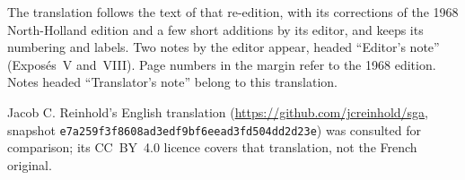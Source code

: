 \documentclass[11pt,a4paper,oneside]{book}
\begin{document}
The translation follows the text of that re-edition, with its corrections of the
1968 North-Holland edition and a few short additions by its editor, and keeps
its numbering and labels. Two notes by the editor appear, headed
``Editor's note'' (Expos\'es~V and~VIII). Page numbers in the margin refer to
the 1968 edition. Notes headed ``Translator's note'' belong to this translation.

Jacob C. Reinhold's English translation
(\url{https://github.com/jcreinhold/sga}, snapshot
\texttt{e7a259f3f8608ad3edf9bf6eead3fd504dd2d23e}) was consulted for
comparison; its CC~BY~4.0 licence covers that translation, not the French
original.

\cleardoublepage
\tableofcontents

\mainmatter















\end{document}
